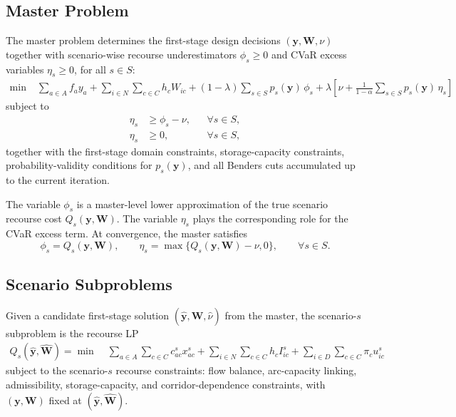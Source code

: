 \documentclass[final,3p,authoryear]{elsarticle}
\theoremstyle{definition}
\begin{document}
\subsection{Master Problem}
\label{sec:master}

The master problem determines the first-stage design decisions
$(\mathbf y,\mathbf W,\nu)$ together with scenario-wise recourse
underestimators $\phi_s \ge 0$ and CVaR excess variables
$\eta_s \ge 0$, for all $s \in S$:
\begin{align}
\min \;
& \sum_{a \in A} f_a y_a
+ \sum_{i \in N}\sum_{c \in C} h_c W_{ic}
+ (1-\lambda)\sum_{s \in S} p_s(\mathbf y)\,\phi_s
+ \lambda\left[
\nu + \frac{1}{1-\alpha}\sum_{s \in S} p_s(\mathbf y)\,\eta_s
\right]
\label{eq:master-obj}
\end{align}
subject to
\begin{align}
\eta_s &\ge \phi_s - \nu,
&& \forall s \in S,
\label{eq:master-cvar-link} \\
\eta_s &\ge 0,
&& \forall s \in S,
\label{eq:master-cvar-nonneg}
\end{align}
together with the first-stage domain constraints, storage-capacity
constraints, probability-validity conditions for $p_s(\mathbf y)$, and
all Benders cuts accumulated up to the current iteration.

The variable $\phi_s$ is a master-level lower approximation of the true
scenario recourse cost $Q_s(\mathbf y,\mathbf W)$. The variable
$\eta_s$ plays the corresponding role for the CVaR excess term. At
convergence, the master satisfies
\[
\phi_s = Q_s(\mathbf y,\mathbf W),
\qquad
\eta_s = \max\{Q_s(\mathbf y,\mathbf W)-\nu,0\},
\qquad \forall s \in S.
\]

\subsection{Scenario Subproblems}
\label{sec:subproblem}

Given a candidate first-stage solution
$(\hat{\mathbf y},\hat{\mathbf W},\hat\nu)$ from the master, the
scenario-$s$ subproblem is the recourse LP
\begin{align}
Q_s(\hat{\mathbf y},\hat{\mathbf W})
=
\min \;
& \sum_{a \in A}\sum_{c \in C} c_{ac}^s x_{ac}^s
+ \sum_{i \in N}\sum_{c \in C} h_c I_{ic}^s
+ \sum_{i \in D}\sum_{c \in C} \pi_c u_{ic}^s
\label{eq:sub-obj}
\end{align}
subject to the scenario-$s$ recourse constraints:
flow balance, arc-capacity linking, admissibility, storage-capacity,
and corridor-dependence constraints, with
$(\mathbf y,\mathbf W)$ fixed at
$(\hat{\mathbf y},\hat{\mathbf W})$.
\end{document}
